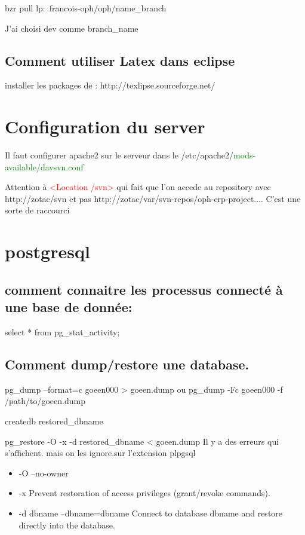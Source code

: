 \documentclass[12pt,a4paper]{article}
\begin{document}
bzr pull lp:~francois-oph/oph/name\_branch

J'ai choisi dev comme branch\_name

\subsection{Comment utiliser Latex dans eclipse}
\label{sec:eclipse_latex}
installer les packages de : http://texlipse.sourceforge.net/

\section{Configuration du server}
\label{sec:conf_server}
Il faut configurer apache2 sur le serveur dans le /etc/apache2/\textcolor{green}{mods-available/davsvn.conf}

Attention à \textcolor{red}{<Location /svn>} qui fait que l'on accede au repository avec http://zotac/svn et pas http://zotac/var/svn-repos/oph-erp-project.... C'est une sorte de raccourci




\section{postgresql}
\label{sec:postgres}

\subsection{comment connaitre les processus connecté à une base de donnée:}
\label{sec:proc}
select * from pg\_stat\_activity;

\subsection{Comment dump/restore une database.}
\label{sec:dump/res}

pg\_dump --format=c goeen000 > goeen.dump
ou
pg\_dump -Fc goeen000 -f /path/to/goeen.dump

createdb restored\_dbname

pg\_restore -O -x -d restored\_dbname < goeen.dump
Il y a des erreurs qui s'affichent. mais on les ignore.sur l'extension plpgsql
\begin{itemize}
\item -O --no-owner
\item -x Prevent restoration of access privileges (grant/revoke commands).
\item -d dbname --dbname=dbname Connect to database dbname and restore directly into the database.
\end{itemize}
\end{document}
